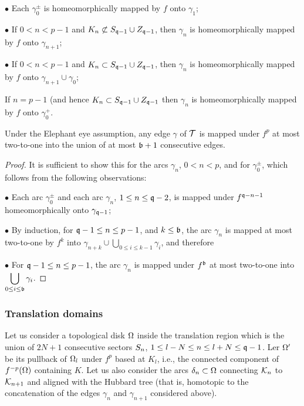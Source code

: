 \ssk\nin $\bullet$
   Each $\gamma_0^\pm$ is homeomorphically  mapped by $f$ onto $\gamma_1$;
  
   \ssk\nin $\bullet$
   If $0< n< p-1$ and $K_n \not\subset  {{S}}_{{\mathfrak{q}}-1}\cup {{Z}}_{{\mathfrak{q}}-1}$,
   then  $\gamma_n $ is homeomorphically  mapped by $f$ onto $\gamma_{n+1}$;

\ssk\nin $\bullet$
    If $0< n< p-1$ and $K_n \subset  {{S}}_{{\mathfrak{q}}-1}\cup {{Z}}_{{\mathfrak{q}}-1}$,
   then  $\gamma_n $ is homeomorphically  mapped by $f$ onto
   $\gamma_{n+1}\cup \gamma_0$; 

 If $n = p-1$ (and hence $K_n \subset  {{S}}_{{\mathfrak{q}}-1}\cup {{Z}}_{{\mathfrak{q}}-1}$
   then  $\gamma_n $ is homeomorphically  mapped by $f$ onto
   $ \gamma_0^+$.


\begin{lem}\label{bounded deg}
  Under the Elephant eye assumption,
  any edge $\gamma$ of  ${\mathcal T}$ is mapped under $f^p$ at most two-to-one
 into the union of at most ${\mathfrak{b}}+ 1$ consecutive  edges.
\end{lem}

\begin{proof}
It is sufficient to show this for the arcs $\gamma_n$, $0< n < p $, and for
$\gamma_0^\pm$, which  follows from the following observations:

\ssk\nin $\bullet$
Each arc $\gamma_0^\pm$ and each arc $\gamma_n$,
$1\leq n  \leq  {\mathfrak{q}}-2 $,  is mapped  under $f^{{\mathfrak{q}}-n-1}$
homeomorphically onto $\gamma_{{\mathfrak{q}}-1}$;

\ssk\nin $\bullet$
By induction, for ${\mathfrak{q}}-1 \leq n \leq  p-1 $,  and $k\le {\mathfrak{b}}$,
the arc $\gamma_n$   is mapped at most two-to-one by
$f^k$  into $\gamma_{n+k}\cup  \displaystyle { \bigcup_{0 \leq i\leq
    k-1}\gamma_i }$, and therefore

\ssk\nin $\bullet$
For ${\mathfrak{q}}-1 \leq n \leq  p-1 $,   the arc $\gamma_n$   is mapped under
$f^{{\mathfrak{b}}} $ at most two-to-one  into $\displaystyle { \bigcup_{0 \leq i\leq   {\mathfrak{b}}}\gamma_i }$.
\end{proof}

\subsubsection{Translation domains}


Let us consider a topological disk ${\Omega} $  inside the translation region
which is the union of $2N+1$ consecutive sectors
${{S}}_n$, $1\leq  l-N \leq  n\leq l+N\leq {\mathfrak{q}}-1$.
Ler ${\Omega}'$ be its pullback of ${\Omega}_l$ under $f^p$ based at $K_l$,
i.e., the connected component of $f^{-p} ({\Omega})$ containing $K$. 
Let us also consider the arcs ${\delta}_n\subset {\Omega}$
connecting ${\mathcal K}_n$ to ${\mathcal K}_{n+1}$ and aligned with the Hubbard tree
(that is,  homotopic to the  concatenation of the edges $\gamma_n$ and
$\gamma_{n+1}$ considered  above). 

